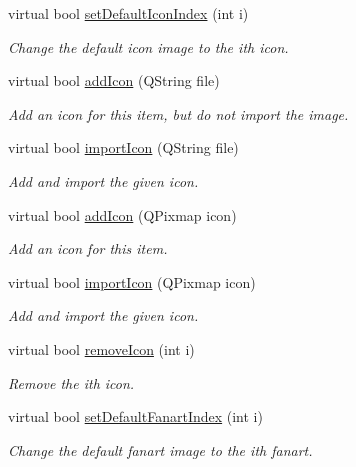 \begin{DoxyCompactItemize}
virtual bool \hyperlink{class_a_w_e_1_1_media_item_ae26ac3837aef37df827a2ac83e06e4c4}{set\-Default\-Icon\-Index} (int i)
\begin{DoxyCompactList}\small\item\em Change the default icon image to the {\ttfamily i}th icon. \end{DoxyCompactList}\item 
virtual bool \hyperlink{class_a_w_e_1_1_media_item_ab196362e2fa0c4cc94c69d345900d577}{add\-Icon} (Q\-String file)
\begin{DoxyCompactList}\small\item\em Add an icon for this item, but do not import the image. \end{DoxyCompactList}\item 
virtual bool \hyperlink{class_a_w_e_1_1_media_item_a1acbeb01a9bf79ec868fec2bff179770}{import\-Icon} (Q\-String file)
\begin{DoxyCompactList}\small\item\em Add and import the given icon. \end{DoxyCompactList}\item 
virtual bool \hyperlink{class_a_w_e_1_1_media_item_ad1ffe588203af7f900aee6c98cf5c5f1}{add\-Icon} (Q\-Pixmap icon)
\begin{DoxyCompactList}\small\item\em Add an icon for this item. \end{DoxyCompactList}\item 
virtual bool \hyperlink{class_a_w_e_1_1_media_item_aeee2b3337a77d2ba3fcdd5d5cb9e30d1}{import\-Icon} (Q\-Pixmap icon)
\begin{DoxyCompactList}\small\item\em Add and import the given icon. \end{DoxyCompactList}\item 
virtual bool \hyperlink{class_a_w_e_1_1_media_item_af8f9b8420f2075068fa353a8e4eacdeb}{remove\-Icon} (int i)
\begin{DoxyCompactList}\small\item\em Remove the {\ttfamily i}th icon. \end{DoxyCompactList}\item 
virtual bool \hyperlink{class_a_w_e_1_1_media_item_a2fe7342f31baaba17b6449dc3323c1d9}{set\-Default\-Fanart\-Index} (int i)
\begin{DoxyCompactList}\small\item\em Change the default fanart image to the {\ttfamily i}th fanart. \end{DoxyCompactList}\item 

\end{DoxyCompactItemize}
